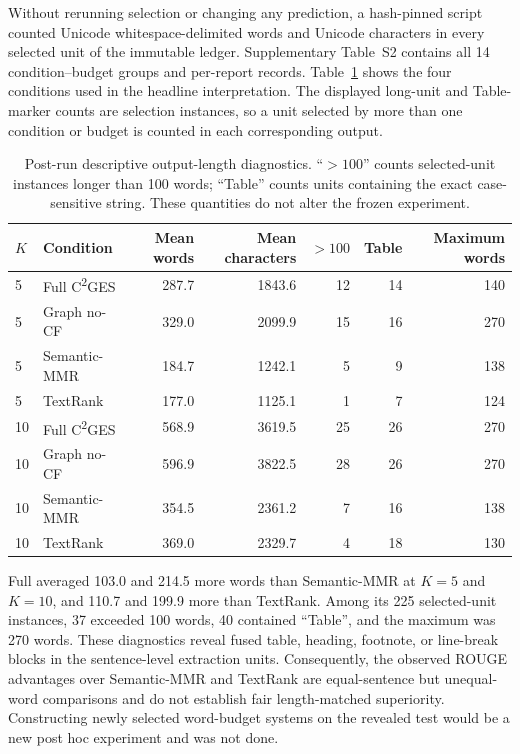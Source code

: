 \documentclass[applsci,article,submit,moreauthors]{Definitions/mdpi}
\newcommand{\cges}{C\textsuperscript{2}GES}
\begin{document}
Without rerunning selection or changing any prediction, a hash-pinned script counted Unicode whitespace-delimited words and Unicode characters in every selected unit of the immutable ledger. Supplementary Table~S2 contains all 14 condition--budget groups and per-report records. Table~\ref{tab:length-audit} shows the four conditions used in the headline interpretation. The displayed long-unit and Table-marker counts are selection instances, so a unit selected by more than one condition or budget is counted in each corresponding output.

\begin{table}[H]
\caption{Post-run descriptive output-length diagnostics. ``$>100$'' counts selected-unit instances longer than 100 words; ``Table'' counts units containing the exact case-sensitive string. These quantities do not alter the frozen experiment.}
\label{tab:length-audit}\centering\small
\begin{tabular}{llrrrrr}
\toprule
$K$ & Condition & Mean words & Mean characters & $>100$ & Table & Maximum words\\
\midrule
5 & Full \cges{} & 287.7 & 1843.6 & 12 & 14 & 140\\
5 & Graph no-CF & 329.0 & 2099.9 & 15 & 16 & 270\\
5 & Semantic-MMR & 184.7 & 1242.1 & 5 & 9 & 138\\
5 & TextRank & 177.0 & 1125.1 & 1 & 7 & 124\\
10 & Full \cges{} & 568.9 & 3619.5 & 25 & 26 & 270\\
10 & Graph no-CF & 596.9 & 3822.5 & 28 & 26 & 270\\
10 & Semantic-MMR & 354.5 & 2361.2 & 7 & 16 & 138\\
10 & TextRank & 369.0 & 2329.7 & 4 & 18 & 130\\
\bottomrule
\end{tabular}
\end{table}

Full averaged 103.0 and 214.5 more words than Semantic-MMR at $K=5$ and $K=10$, and 110.7 and 199.9 more than TextRank. Among its 225 selected-unit instances, 37 exceeded 100 words, 40 contained ``Table'', and the maximum was 270 words. These diagnostics reveal fused table, heading, footnote, or line-break blocks in the sentence-level extraction units. Consequently, the observed ROUGE advantages over Semantic-MMR and TextRank are equal-sentence but unequal-word comparisons and do not establish fair length-matched superiority. Constructing newly selected word-budget systems on the revealed test would be a new post hoc experiment and was not done.
\end{document}
